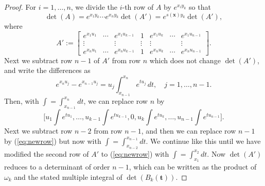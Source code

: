 \documentclass[10pt,a4paper]{amsart}
\def\bft{\mathbf{t}}
\def\bfx{\mathbf{x}}
\begin{document}
\begin{proof}
For $i=1,\ldots,n$, we divide the $i$-th row of $A$ by $e^{x_i y_k}$
so that
$$
\det(A) = e^{x_1y_k} \cdots e^{x_ny_k} \det(A')
	= e^{s(\bfx)y_k} \det(A'),
$$
where
$$
A' :=
\left[
\begin{matrix}
e^{x_1 u_1} & \cdots & e^{x_1 u_{k-1}} & 1 &
e^{x_1 u_k} & \cdots & e^{x_1 u_{n-1}} \\
\vdots & & \vdots & \vdots & \vdots & & \vdots \\
e^{x_n u_1} & \cdots & e^{x_n u_{k-1}} & 1 &
e^{x_n u_k} & \cdots & e^{x_n u_{n-1}}
\end{matrix}
\right].
$$
Next we subtract row $n-1$ of $A'$ from row $n$ which does not
change $\det(A')$,
and write the differences as
$$ e^{x_n u_j} - e^{x_{n-1} u_j}
  = u_j \int_{x_{n-1}}^{x_n} e^{tu_j} \, dt, 
 \quad j=1,\ldots,n-1. $$
Then, with $\int = \int_{x_{n-1}}^{x_n} dt$, we can
replace row $n$ by
\begin{equation}\label{eq:newrow}
 \Big[u_1 \int e^{tu_1},\ldots,u_{k-1} \int e^{tu_{k-1}},0, 
  u_k \int e^{tu_k},\ldots,u_{n-1}\int e^{tu_{n-1}}\Big].
\end{equation}
Next we subtract row $n-2$ from row $n-1$,
and then we can replace row $n-1$ by (\ref{eq:newrow}) but now
with $\int = \int_{x_{n-2}}^{x_{n-1}} dt$.
We continue like this until we have modified the second row of $A'$ to
(\ref{eq:newrow}) with $\int = \int_{x_1}^{x_2} dt$.
Now $\det(A')$ reduces to a
determinant of order $n-1$, which can be written as the
product of $\omega_k$ and the stated multiple integral
of $\det(B_k(\bft))$.
\end{proof}
\end{document}
